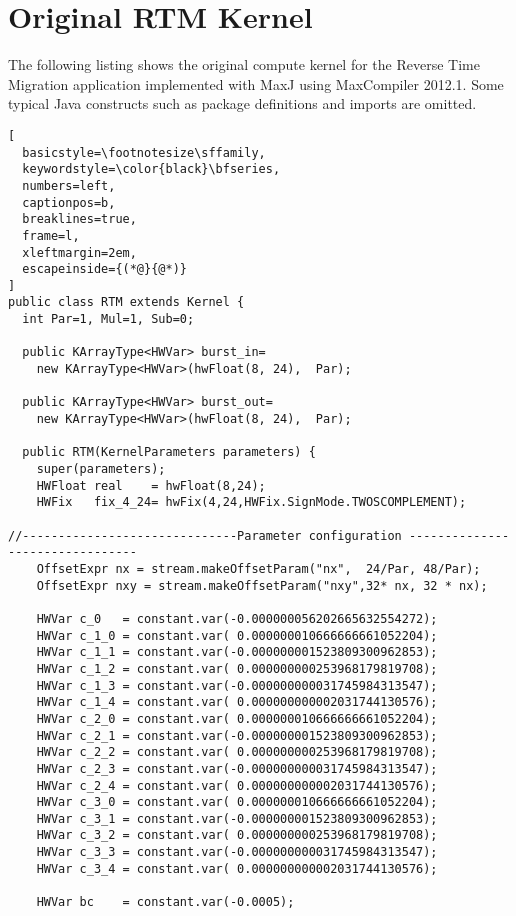 \chapter{Original RTM Kernel}
\label{app:rtm-kernel}
The following listing shows the original compute kernel for the
Reverse Time Migration application implemented with MaxJ using
MaxCompiler 2012.1. Some typical Java constructs such as package
definitions and imports are omitted.

\begin{lstlisting}[
  basicstyle=\footnotesize\sffamily,
  keywordstyle=\color{black}\bfseries,
  numbers=left,
  captionpos=b,
  breaklines=true,
  frame=l,
  xleftmargin=2em,
  escapeinside={(*@}{@*)}
]
public class RTM extends Kernel {
  int Par=1, Mul=1, Sub=0;

  public KArrayType<HWVar> burst_in=
    new KArrayType<HWVar>(hwFloat(8, 24),  Par);

  public KArrayType<HWVar> burst_out=
    new KArrayType<HWVar>(hwFloat(8, 24),  Par);

  public RTM(KernelParameters parameters) {
    super(parameters);
    HWFloat real    = hwFloat(8,24);
    HWFix   fix_4_24= hwFix(4,24,HWFix.SignMode.TWOSCOMPLEMENT);

//------------------------------Parameter configuration --------------------------------
    OffsetExpr nx = stream.makeOffsetParam("nx",  24/Par, 48/Par);
    OffsetExpr nxy = stream.makeOffsetParam("nxy",32* nx, 32 * nx);

    HWVar c_0   = constant.var(-0.000000056202665632554272);
    HWVar c_1_0 = constant.var( 0.000000010666666661052204);
    HWVar c_1_1 = constant.var(-0.000000001523809300962853);
    HWVar c_1_2 = constant.var( 0.000000000253968179819708);
    HWVar c_1_3 = constant.var(-0.000000000031745984313547);
    HWVar c_1_4 = constant.var( 0.000000000002031744130576);
    HWVar c_2_0 = constant.var( 0.000000010666666661052204);
    HWVar c_2_1 = constant.var(-0.000000001523809300962853);
    HWVar c_2_2 = constant.var( 0.000000000253968179819708);
    HWVar c_2_3 = constant.var(-0.000000000031745984313547);
    HWVar c_2_4 = constant.var( 0.000000000002031744130576);
    HWVar c_3_0 = constant.var( 0.000000010666666661052204);
    HWVar c_3_1 = constant.var(-0.000000001523809300962853);
    HWVar c_3_2 = constant.var( 0.000000000253968179819708);
    HWVar c_3_3 = constant.var(-0.000000000031745984313547);
    HWVar c_3_4 = constant.var( 0.000000000002031744130576);

    HWVar bc    = constant.var(-0.0005);


\end{lstlisting}
